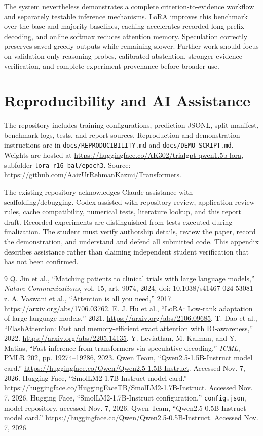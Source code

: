 \documentclass[conference]{IEEEtran}
\begin{document}
The system nevertheless demonstrates a complete criterion-to-evidence workflow and separately testable inference mechanisms. LoRA improves this benchmark over the base and majority baselines, caching accelerates recorded long-prefix decoding, and online softmax reduces attention memory. Speculation correctly preserves saved greedy outputs while remaining slower. Further work should focus on validation-only reasoning probes, calibrated abstention, stronger evidence verification, and complete experiment provenance before broader use.

\appendices
\section{Reproducibility and AI Assistance}
The repository includes training configurations, prediction JSONL, split manifest, benchmark logs, tests, and report sources. Reproduction and demonstration instructions are in \texttt{docs/REPRODUCIBILITY.md} and \texttt{docs/DEMO\_SCRIPT.md}. Weights are hosted at \url{https://huggingface.co/AK302/trialgpt-qwen1.5b-lora}, subfolder \texttt{lora\_r16\_bal/epoch3}. Source: \url{https://github.com/AaizUrRehmanKazmi/Transformers}.

The existing repository acknowledges Claude assistance with scaffolding/debugging. Codex assisted with repository review, application review rules, cache compatibility, numerical tests, literature lookup, and this report draft. Recorded experiments are distinguished from tests executed during finalization. The student must verify authorship details, review the paper, record the demonstration, and understand and defend all submitted code. This appendix describes assistance rather than claiming independent student verification that has not been confirmed.

\begin{thebibliography}{9}
 Q. Jin et al., ``Matching patients to clinical trials with large language models,'' \emph{Nature Communications}, vol. 15, art. 9074, 2024, doi: 10.1038/s41467-024-53081-z.
 A. Vaswani et al., ``Attention is all you need,'' 2017. \url{https://arxiv.org/abs/1706.03762}.
 E. J. Hu et al., ``LoRA: Low-rank adaptation of large language models,'' 2021. \url{https://arxiv.org/abs/2106.09685}.
 T. Dao et al., ``FlashAttention: Fast and memory-efficient exact attention with IO-awareness,'' 2022. \url{https://arxiv.org/abs/2205.14135}.
 Y. Leviathan, M. Kalman, and Y. Matias, ``Fast inference from transformers via speculative decoding,'' \emph{ICML}, PMLR 202, pp. 19274--19286, 2023.
 Qwen Team, ``Qwen2.5-1.5B-Instruct model card.'' \url{https://huggingface.co/Qwen/Qwen2.5-1.5B-Instruct}. Accessed Nov. 7, 2026.
 Hugging Face, ``SmolLM2-1.7B-Instruct model card.'' \url{https://huggingface.co/HuggingFaceTB/SmolLM2-1.7B-Instruct}. Accessed Nov. 7, 2026.
 Hugging Face, ``SmolLM2-1.7B-Instruct configuration,'' \texttt{config.json}, model repository, accessed Nov. 7, 2026.
 Qwen Team, ``Qwen2.5-0.5B-Instruct model card.'' \url{https://huggingface.co/Qwen/Qwen2.5-0.5B-Instruct}. Accessed Nov. 7, 2026.
\end{thebibliography}
\end{document}
